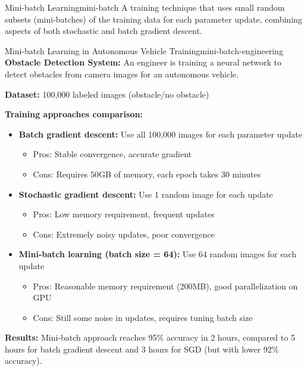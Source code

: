 \documentclass[12pt]{article}
\begin{document}
\begin{definition}{Mini-batch Learning}{mini-batch}
A training technique that uses small random subsets (mini-batches) of the training data for each parameter update, combining aspects of both stochastic and batch gradient descent.
\end{definition}

\begin{example}{Mini-batch Learning in Autonomous Vehicle Training}{mini-batch-engineering}
\textbf{Obstacle Detection System:} An engineer is training a neural network to detect obstacles from camera images for an autonomous vehicle.

\textbf{Dataset:} 100,000 labeled images (obstacle/no obstacle)

\textbf{Training approaches comparison:}
\begin{itemize}
    \item \textbf{Batch gradient descent:} Use all 100,000 images for each parameter update
    \begin{itemize}
        \item Pros: Stable convergence, accurate gradient
        \item Cons: Requires 50GB of memory, each epoch takes 30 minutes
    \end{itemize}
    
    \item \textbf{Stochastic gradient descent:} Use 1 random image for each update
    \begin{itemize}
        \item Pros: Low memory requirement, frequent updates
        \item Cons: Extremely noisy updates, poor convergence
    \end{itemize}
    
    \item \textbf{Mini-batch learning (batch size = 64):} Use 64 random images for each update
    \begin{itemize}
        \item Pros: Reasonable memory requirement (200MB), good parallelization on GPU
        \item Cons: Still some noise in updates, requires tuning batch size
    \end{itemize}
\end{itemize}

\textbf{Results:} Mini-batch approach reaches 95\% accuracy in 2 hours, compared to 5 hours for batch gradient descent and 3 hours for SGD (but with lower 92\% accuracy).
\end{example}
\end{document}
